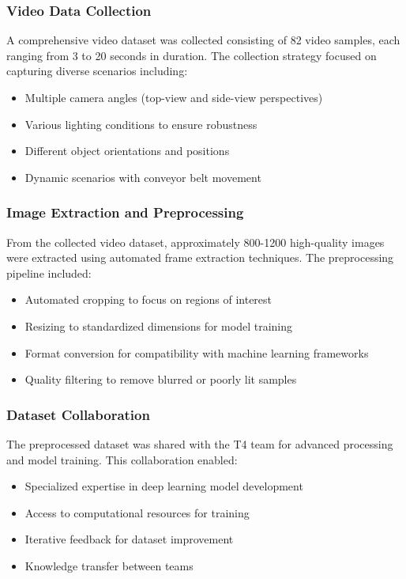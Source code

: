 \documentclass[12pt]{article}
\begin{document}
\subsubsection{Video Data Collection}
A comprehensive video dataset was collected consisting of 82 video samples, each ranging from 3 to 20 seconds in duration. The collection strategy focused on capturing diverse scenarios including:
\begin{itemize}
\item Multiple camera angles (top-view and side-view perspectives)
\item Various lighting conditions to ensure robustness
\item Different object orientations and positions
\item Dynamic scenarios with conveyor belt movement
\end{itemize}

\subsubsection{Image Extraction and Preprocessing}
From the collected video dataset, approximately 800-1200 high-quality images were extracted using automated frame extraction techniques. The preprocessing pipeline included:
\begin{itemize}
\item Automated cropping to focus on regions of interest
\item Resizing to standardized dimensions for model training
\item Format conversion for compatibility with machine learning frameworks
\item Quality filtering to remove blurred or poorly lit samples
\end{itemize}

\subsubsection{Dataset Collaboration}
The preprocessed dataset was shared with the T4 team for advanced processing and model training. This collaboration enabled:
\begin{itemize}
\item Specialized expertise in deep learning model development
\item Access to computational resources for training
\item Iterative feedback for dataset improvement
\item Knowledge transfer between teams
\end{itemize}
\end{document}
